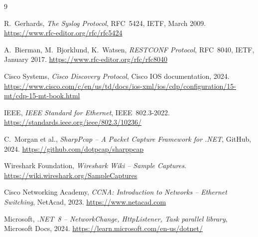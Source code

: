 \documentclass[12pt,a4paper]{article}
\begin{document}
\begin{thebibliography}{9}

R.~Gerhards,
\textit{The Syslog Protocol},
RFC~5424, IETF, March 2009.
\url{https://www.rfc-editor.org/rfc/rfc5424}

A.~Bierman, M.~Bjorklund, K.~Watsen,
\textit{RESTCONF Protocol},
RFC~8040, IETF, January 2017.
\url{https://www.rfc-editor.org/rfc/rfc8040}

Cisco Systems,
\textit{Cisco Discovery Protocol},
Cisco IOS documentation, 2024.
\url{https://www.cisco.com/c/en/us/td/docs/ios-xml/ios/cdp/configuration/15-mt/cdp-15-mt-book.html}

IEEE,
\textit{IEEE Standard for Ethernet},
IEEE~802.3-2022.
\url{https://standards.ieee.org/ieee/802.3/10236/}

C.~Morgan et al.,
\textit{SharpPcap -- A Packet Capture Framework for .NET},
GitHub, 2024.
\url{https://github.com/dotpcap/sharppcap}

Wireshark Foundation,
\textit{Wireshark Wiki -- Sample Captures}.
\url{https://wiki.wireshark.org/SampleCaptures}

Cisco Networking Academy,
\textit{CCNA: Introduction to Networks -- Ethernet Switching},
NetAcad, 2023.
\url{https://www.netacad.com}

Microsoft,
\textit{.NET~8 -- NetworkChange, HttpListener, Task parallel library},
Microsoft Docs, 2024.
\url{https://learn.microsoft.com/en-us/dotnet/}

\end{thebibliography}
\end{document}
